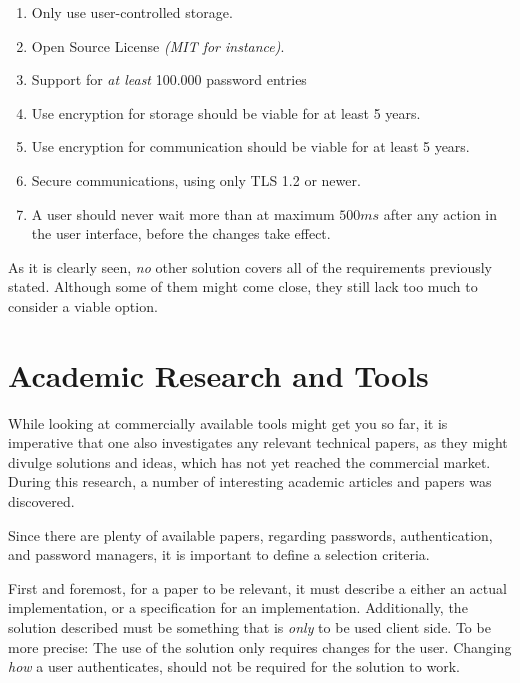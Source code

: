 					\vspace{-3ex}\begin{enumerate}
						\setlength\itemsep{0.1em}
						\item Only use user-controlled storage.\label{item:user_storage}
						\item Open Source License \emph{(MIT for instance)}. \label{item:open-source}
						\item Support for \emph{at least} 100.000 password entries \label{item:entries}
						\item Use encryption for storage should be viable for at least 5 years. \label{item:encryption}
						\item Use encryption for communication should be viable for at least 5 years. \label{item:comms}
						\item Secure communications, using only TLS 1.2 or newer. \label{item:tls1.2}
						\item A user should never wait more than at maximum $500ms$ after any action in the user interface, before the changes take effect. \label{item:delay}
					\end{enumerate}

				

				As it is clearly seen, \emph{no} other solution covers all of the requirements previously stated. Although some of them might come close, they still lack too much to consider a viable option.
		

	\section{Academic Research and Tools}
		While looking at commercially available tools might get you so far, it is imperative that one also investigates any relevant technical papers, as they might divulge solutions and ideas, which has not yet reached the commercial market. During this research, a number of interesting academic articles and papers was discovered. 

		Since there are plenty of available papers, regarding passwords, authentication, and password managers, it is important to define a selection criteria.

		First and foremost, for a paper to be relevant, it must describe a either an actual implementation, or a specification for an implementation. Additionally, the solution described must be something that is \emph{only} to be used client side. To be more precise: The use of the solution only requires changes for the user. Changing \emph{how} a user authenticates, should not be required for the solution to work.

